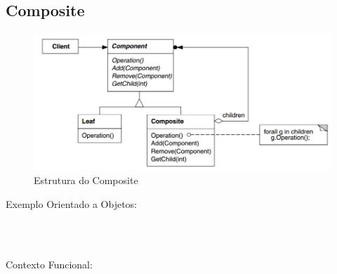 \subsection{Composite}

\begin{figure}[htb]
	\caption{\label{fig_grafico}Estrutura do Composite}
	\begin{center}
	    \includegraphics[scale=0.5]{5_padroes-contexto-funcional/5.2_estruturais/5.2.3_composite/diagram.png}
	\end{center}
\end{figure}

Exemplo Orientado a Objetos:

\begin{lstlisting}[caption={Composite Orientado a Objetos},label=oocomposite]



\end{lstlisting}

Contexto Funcional:


\begin{lstlisting}[caption={Composite Funcional},label=fpcomposite]
    

    
\end{lstlisting}